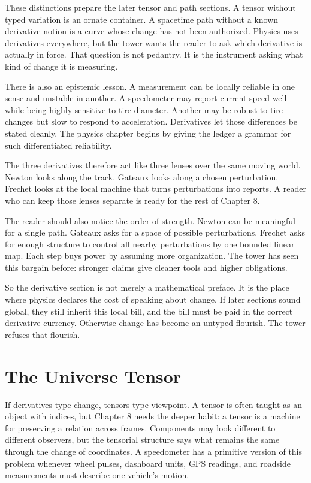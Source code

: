 These distinctions prepare the later tensor and path sections. A tensor
without typed variation is an ornate container. A spacetime path without a
known derivative notion is a curve whose change has not been authorized.
Physics uses derivatives everywhere, but the tower wants the reader to ask
which derivative is actually in force. That question is not pedantry. It is the
instrument asking what kind of change it is measuring.

There is also an epistemic lesson. A measurement can be locally reliable in one
sense and unstable in another. A speedometer may report current speed well
while being highly sensitive to tire diameter. Another may be robust to tire
changes but slow to respond to acceleration. Derivatives let those differences
be stated cleanly. The physics chapter begins by giving the ledger a grammar
for such differentiated reliability.

The three derivatives therefore act like three lenses over the same moving
world. Newton looks along the track. Gateaux looks along a chosen perturbation.
Frechet looks at the local machine that turns perturbations into reports. A
reader who can keep those lenses separate is ready for the rest of Chapter 8.

The reader should also notice the order of strength. Newton can be meaningful
for a single path. Gateaux asks for a space of possible perturbations. Frechet
asks for enough structure to control all nearby perturbations by one bounded
linear map. Each step buys power by assuming more organization. The tower has
seen this bargain before: stronger claims give cleaner tools and higher
obligations.

So the derivative section is not merely a mathematical preface. It is the place
where physics declares the cost of speaking about change. If later sections
sound global, they still inherit this local bill, and the bill must be paid in
the correct derivative currency.
Otherwise change has become an untyped flourish.
The tower refuses that flourish.

\section{The Universe Tensor}
\label{se:universe-tensor}

If derivatives type change, tensors type viewpoint. A tensor is often taught as
an object with indices, but Chapter 8 needs the deeper habit: a tensor is a
machine for preserving a relation across frames. Components may look different
to different observers, but the tensorial structure says what remains the same
through the change of coordinates. A speedometer has a primitive version of
this problem whenever wheel pulses, dashboard units, GPS readings, and roadside
measurements must describe one vehicle's motion.


